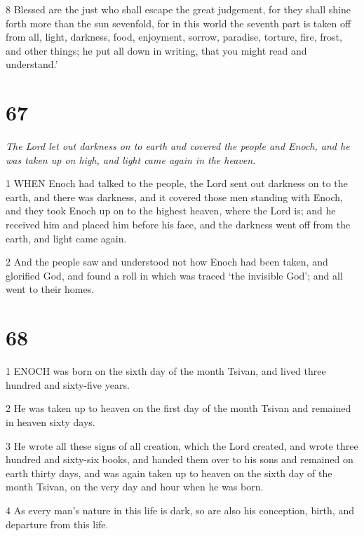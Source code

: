 \par 8 Blessed are the just who shall escape the great judgement, for they shall shine forth more than the sun sevenfold, for in this world the seventh part is taken off from all, light, darkness, food, enjoyment, sorrow, paradise, torture, fire, frost, and other things; he put all down in writing, that you might read and understand.'

\chapter{67}

\par \textit{The Lord let out darkness on to earth and covered the people and Enoch, and he was taken up on high, and light came again in the heaven.}

\par 1 WHEN Enoch had talked to the people, the Lord sent out darkness on to the earth, and there was darkness, and it covered those men standing with Enoch, and they took Enoch up on to the highest heaven, where the Lord is; and he received him and placed him before his face, and the darkness went off from the earth, and light came again.

\par 2 And the people saw and understood not how Enoch had been taken, and glorified God, and found a roll in which was traced ‘the invisible God’; and all went to their homes.

\chapter{68}

\par 1 ENOCH was born on the sixth day of the month Tsivan, and lived three hundred and sixty-five years.

\par 2 He was taken up to heaven on the first day of the month Tsivan and remained in heaven sixty days.

\par 3 He wrote all these signs of all creation, which the Lord created, and wrote three hundred and sixty-six books, and handed them over to his sons and remained on earth thirty days, and was again taken up to heaven on the sixth day of the month Tsivan, on the very day and hour when he was born.

\par 4 As every man's nature in this life is dark, so are also his conception, birth, and departure from this life.

